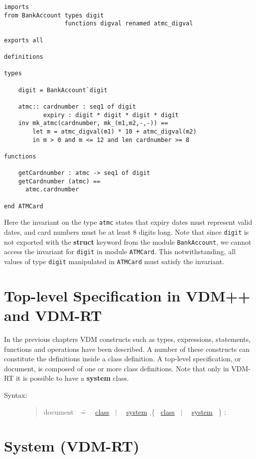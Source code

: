 \documentclass{overturerepchap}
\newcommand{\Rule}[2]{
  \begin{quote}\begin{tabbing}
    #1\index{#1}\ \ \= = \ \ \= #2  ; %

  \end{tabbing}\end{quote}
  }
\newcommand{\Ruleref}[1]{
  \hyperlink{rule:#1}{#1}}
\newcommand{\SeqPt}[1]{\{\ #1\ \}}
\newcommand{\dsepl}{\ $|$\ }
\newcommand{\keyw}[1]{{\bf\ttfamily #1}}
\begin{document}
{\begin{description}
\begin{lstlisting}
imports
from BankAccount types digit
                 functions digval renamed atmc_digval

exports all

definitions

types

    digit = BankAccount`digit

    atmc:: cardnumber : seq1 of digit
           expiry : digit * digit * digit * digit
    inv mk_atmc(cardnumber, mk_(m1,m2,-,-)) ==
        let m = atmc_digval(m1) * 10 + atmc_digval(m2) 
        in m > 0 and m <= 12 and len cardnumber >= 8

functions

    getCardnumber : atmc -> seq1 of digit
    getCardnumber (atmc) ==
      atmc.cardnumber

end ATMCard
\end{lstlisting}
Here the invariant on the type \texttt{atmc} states that expiry dates
must represent valid dates, and card numbers must be at least 8 digits
long. Note that since \texttt{digit} is not exported with the
\keyw{struct} keyword from the module \texttt{BankAccount}, we cannot
access the invariant for \texttt{digit} in module
\texttt{ATMCard}. This notwithstanding, all values of type
\texttt{digit} manipulated in \texttt{ATMCard} must satisfy the
invariant.

\end{description}

\section{Top-level Specification in VDM++ and VDM-RT}

In the previous chapters VDM constructs such as types,
expressions, statements, functions and operations have been
described. A number of these constructs can constitute the definitions
inside a class definition. A top-level specification, or document, is
composed of one or more class definitions. Note that only in VDM-RT it
is possible to have a \keyw{system} class.

\begin{description}
\item[Syntax:]
\Rule{document}{
   \Ruleref{class}
   \dsepl\ \Ruleref{system}
   ,\SeqPt{\Ruleref{class}
   \dsepl\ \Ruleref{system}
         }
  }
\end{description}

\section{System (VDM-RT) }\label{sec:system}

}
\end{document}
